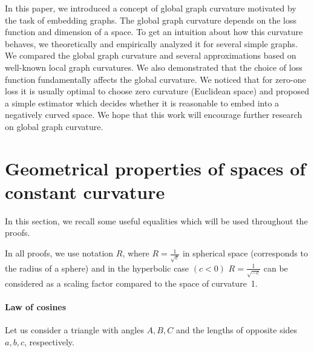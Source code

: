 \documentclass{article} %
\begin{document}
In this paper, we introduced a concept of global graph curvature motivated by the task of embedding graphs. The global graph curvature depends on the loss function and dimension of a space. To get an intuition about how this curvature behaves, we theoretically and empirically analyzed it for several simple graphs. We compared the global graph curvature and several approximations based on well-known local graph curvatures. We also demonstrated that the choice of loss function fundamentally affects the global curvature. We noticed that for zero-one loss it is usually optimal to choose zero curvature (Euclidean space) and proposed a simple estimator which decides whether it is reasonable to embed into a negatively curved space. We hope that this work will encourage further research on global graph curvature.





\appendix

\section{Geometrical properties of spaces of constant curvature}\label{sec:properties}

In this section, we recall some useful equalities which will be used throughout the proofs.

In all proofs, we use notation $R$, where $R = \frac{1}{\sqrt{c}}$ in spherical space (corresponds to the radius of a sphere) and in the hyperbolic case $(c < 0)$ $R = \frac{1}{\sqrt{-c}}$ can be considered as a scaling factor compared to the space of curvature~1.

\paragraph{Law of cosines}

Let us consider a triangle with angles $A, B, C$ and the lengths of opposite sides $a, b, c$, respectively.
\end{document}
